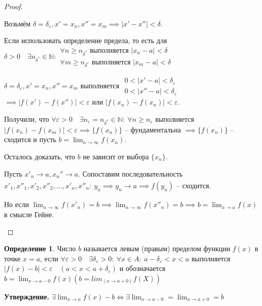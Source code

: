 \documentclass[a4paper,oneside]{article}
\newcommand{\dslim}{\displaystyle\lim}
\newcommand{\dslimn}{\dslim_{n \to \infty}}
\newcommand{\N}{\mathbb{N}}
\newcommand{\eps}{\varepsilon}
\newcommand{\approach}[1]{\underset{#1}{\longrightarrow}}
\theoremstyle{definition}
\newtheorem{definition}{Определение}[subsection]
\theoremstyle{definition}
\theoremstyle{definition}
\begin{document}
\begin{proof}
\begin{enumerate}[label=\alph*)]
            Возьмём $\delta = \delta_\eps, x' = x_n, x'' = x_m \implies | x' - x'' | < \delta$.

            Если использовать определение предела, то есть для $\delta > 0 \quad \exists n_{\delta^*} \in \N:
            \begin{array}{c}
                \forall n \ge n_{\delta^*} \text{ выполняется } | x_n - a | < \delta \\
                \forall m \ge n_{\delta^*} \text{ выполняется } | x_m - a | < \delta
            \end{array}$

            $\delta = \delta_\eps, x' = x_n, x'' = x_m$ выполняется
            $\begin{array}{c}
                0 < |x' - a| < \delta_\eps \\
                0 < |x'' - a| < \delta_\eps
            \end{array}$
            $\implies |f(x') - f(x'')| < \eps$ или $|f(x_n) - f(x_n)| < \eps$.
            
            Получили, что $\forall \eps > 0 \quad \exists n_\eps = n_{\delta^*} \in \N: \:
            \forall n \ge n_\eps$ выполняется $|f(x_n) - f(x_m)| < \eps \implies
            \{ f(x_n) \}$ -- фундаментальна $\implies \{ f(x_n) \}$ -- сходится и пусть
            $b = \dslimn f(x_n)$.

            Осталось доказать, что $b$ не зависит от выбора $\{ x_n \}$.

            Пусть $x'_n \approach{} a, x_n'' \approach{} a$. Сопоставим последовательность
            $x'_1, x''_1, x'_2, x''_2, \dots, x'_n, x''_n: \: y_n \implies y_n \approach{} a
            \implies f(y_n)$ -- сходится.

            Но если $\dslimn f(x'_n) = b \implies \dslimn f(x''_n) = b \implies b = \dslim_{x \to a} f(x)$
            в смысле Гейне.
    \end{enumerate}
\end{proof}

\begin{definition}
	Число $b$ называется левым (правым) пределом функции $f(x)$ в точке $x = a$, 
    если $\forall \eps > 0 \quad \exists \delta_\eps > 0: \: \forall x \in A: \: a - \delta_\eps < x < a$ 
    выполняется $|f(x) - b| < \eps \quad (a < x < a + \delta_\eps)$ и обозначается 
    $b = \dslim_{x \to a - 0} f(x) (b = lim_(x \to a+0) f(X))$
\end{definition}

\textbf{Утверждение. }
$\exists \dslim_{x \to a} f(x) - b \iff \exists \dslim_{x \to a - 0} = \dslim_{x \to a + 0} = b$
\end{document}
